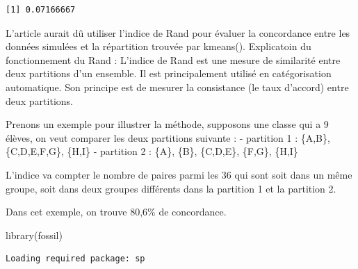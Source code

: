 \documentclass{article}
\newenvironment{Shaded}{\begin{snugshade}}{\end{snugshade}}
\newcommand{\AttributeTok}[1]{\textcolor[rgb]{0.40,0.45,0.13}{#1}}
\newcommand{\CommentTok}[1]{\textcolor[rgb]{0.37,0.37,0.37}{#1}}
\newcommand{\ConstantTok}[1]{\textcolor[rgb]{0.56,0.35,0.01}{#1}}
\newcommand{\DecValTok}[1]{\textcolor[rgb]{0.68,0.00,0.00}{#1}}
\newcommand{\FunctionTok}[1]{\textcolor[rgb]{0.28,0.35,0.67}{#1}}
\newcommand{\NormalTok}[1]{\textcolor[rgb]{0.00,0.23,0.31}{#1}}
\newcommand{\OtherTok}[1]{\textcolor[rgb]{0.00,0.23,0.31}{#1}}
\newcommand{\SpecialCharTok}[1]{\textcolor[rgb]{0.37,0.37,0.37}{#1}}
\begin{document}
\begin{Shaded}
\end{Shaded}

\begin{verbatim}
[1] 0.07166667
\end{verbatim}

L'article aurait dû utiliser l'indice de Rand pour évaluer la
concordance entre les données simulées et la répartition trouvée par
kmeans(). Explicatoin du fonctionnement du Rand : L'indice de Rand est
une mesure de similarité entre deux partitions d'un ensemble. Il est
principalement utilisé en catégorisation automatique. Son principe est
de mesurer la consistance (le taux d'accord) entre deux partitions.

Prenons un exemple pour illustrer la méthode, supposons une classe qui a
9 élèves, on veut comparer les deux partitions suivante : - partition 1
: \{A,B\}, \{C,D,E,F,G\}, \{H,I\} - partition 2 : \{A\}, \{B\},
\{C,D,E\}, \{F,G\}, \{H,I\}

L'indice va compter le nombre de paires parmi les 36 qui sont soit dans
un même groupe, soit dans deux groupes différents dans la partition 1 et
la partition 2.

Dans cet exemple, on trouve 80,6\% de concordance.

\begin{Shaded}
\begin{Highlighting}[]
\FunctionTok{library}\NormalTok{(fossil)}
\end{Highlighting}
\end{Shaded}

\begin{verbatim}
Loading required package: sp
\end{verbatim}
\end{document}
